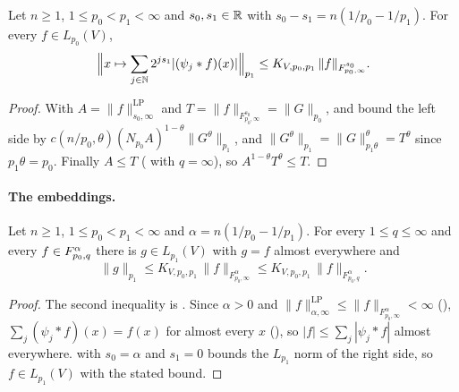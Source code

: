 \begin{lemma}
\label{lem:critical-integrated-bound}
\leanok
{}
Let $n \geq 1$, $1 \leq p_0 < p_1 < \infty$ and $s_0, s_1 \in \mathbb{R}$ with
$s_0 - s_1 = n(1/p_0 - 1/p_1)$. For every $f \in L_{p_0}(V)$,
\[
  \Bigl\| x \mapsto \sum_{j \in \mathbb{N}} 2^{j s_1} |(\psi_j * f)(x)| \Bigr\|_{p_1}
  \leq K_{V,p_0,p_1} \, \|f\|_{F^{s_0}_{p_0,\infty}} .
\]
\end{lemma}

\begin{proof}
\leanok
With $A = \|f\|^{\mathrm{LP}}_{s_0,\infty}$ and $T = \|f\|_{F^{s_0}_{p_0,\infty}} = \|G\|_{p_0}$,
 and  bound the left side by
$c(n/p_0, \theta) (N_{p_0} A)^{1-\theta} \|G^\theta\|_{p_1}$, and
$\|G^\theta\|_{p_1} = \|G\|_{p_1 \theta}^\theta = T^\theta$ since $p_1\theta = p_0$. Finally
$A \leq T$ ( with $q = \infty$), so
$A^{1-\theta} T^\theta \leq T$.
\end{proof}

\paragraph{The embeddings.}

\begin{theorem}
\label{thm:triebel-lizorkin-into-lp}
\leanok
{}
Let $n \geq 1$, $1 \leq p_0 < p_1 < \infty$ and $\alpha = n(1/p_0 - 1/p_1)$. For every
$1 \leq q \leq \infty$ and every $f \in F^{\alpha}_{p_0,q}$ there is $g \in L_{p_1}(V)$ with
$g = f$ almost everywhere and
\[
  \|g\|_{p_1} \leq K_{V,p_0,p_1} \, \|f\|_{F^{\alpha}_{p_0,\infty}}
  \leq K_{V,p_0,p_1} \, \|f\|_{F^{\alpha}_{p_0,q}} .
\]
\end{theorem}

\begin{proof}
\leanok
The second inequality is . Since $\alpha > 0$ and
$\|f\|^{\mathrm{LP}}_{\alpha,\infty} \leq \|f\|_{F^\alpha_{p_0,\infty}} < \infty$
(), $\sum_j (\psi_j * f)(x) = f(x)$ for almost every $x$
(), so $|f| \leq \sum_j |\psi_j * f|$ almost everywhere.
 with $s_0 = \alpha$ and $s_1 = 0$ bounds the $L_{p_1}$ norm
of the right side, so $f \in L_{p_1}(V)$ with the stated bound.
\end{proof}


